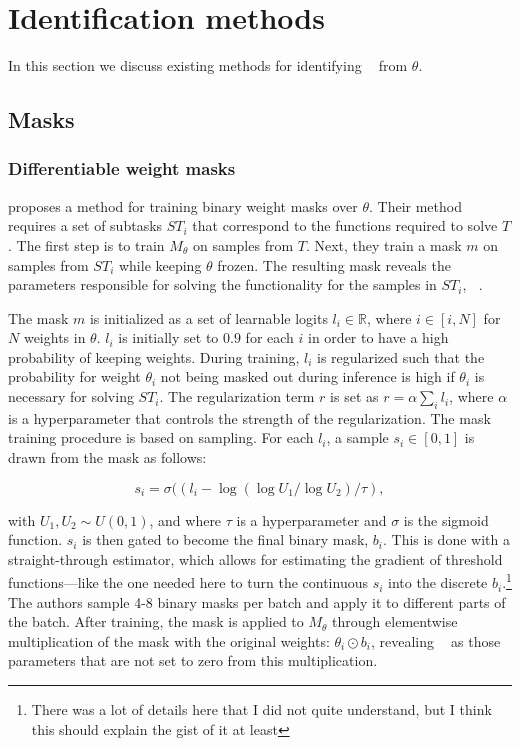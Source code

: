 \documentclass[11pt]{article}
\DeclareMathOperator*{\subnetwork}{\hat{\theta_i}}
\begin{document}
\section{Identification methods}
In this section we discuss existing methods for identifying $\subnetwork$ from $\theta$.
\subsection{Masks}
\subsubsection{Differentiable weight masks}
\citet{csordas2020neural} proposes a method for training binary weight masks over $\theta$. Their method requires a set of subtasks $ST_i$ that correspond to the functions required to solve $T$. The first step is to train $M_\theta$ on samples from $T$.  Next, they train a mask $m$ on samples from $ST_i$ while keeping $\theta$ frozen. The resulting mask reveals the parameters responsible for solving the functionality for the samples in $ST_i$, $\subnetwork$.

The mask $m$ is initialized as a set of learnable logits $l_i \in \mathbb{R}$, where $i \in [i, N]$ for $N$ weights in $\theta$. $l_i$ is initially set to $0.9$ for each $i$ in order to have a high probability of keeping weights. During training, $l_i$ is regularized such that the probability for weight $\theta_i$ not being masked out during inference is high if $\theta_i$ is necessary for solving $ST_i$. The regularization term $r$ is set as $r = \alpha \sum_i l_i$, where $\alpha$ is a hyperparameter that controls the strength of the regularization. The mask training procedure is based on sampling. For each $l_i$, a sample $s_i \in [0, 1]$ is drawn from the mask as follows:

\begin{equation}
s_i = \sigma((l_i - \log(\log U_1 / \log U_2) / \tau),
\end{equation}

with $U_1, U_2 \sim U(0,1)$, and where $\tau$ is a hyperparameter and $\sigma$ is the sigmoid function. $s_i$ is then gated to become the final binary mask, $b_i$. This is done with a straight-through estimator, which allows for estimating the gradient of threshold functions---like the one needed here to turn the continuous $s_i$ into the discrete $b_i$.\footnote{There was a lot of details here that I did not quite understand, but I think this should explain the gist of it at least} The authors sample 4-8 binary masks per batch and apply it to different parts of the batch. After training, the mask is applied to $M_\theta$ through elementwise multiplication of the mask with the original weights: $\theta_i \odot b_i$, revealing $\subnetwork$ as those parameters that are not set to zero from this multiplication.
\end{document}
